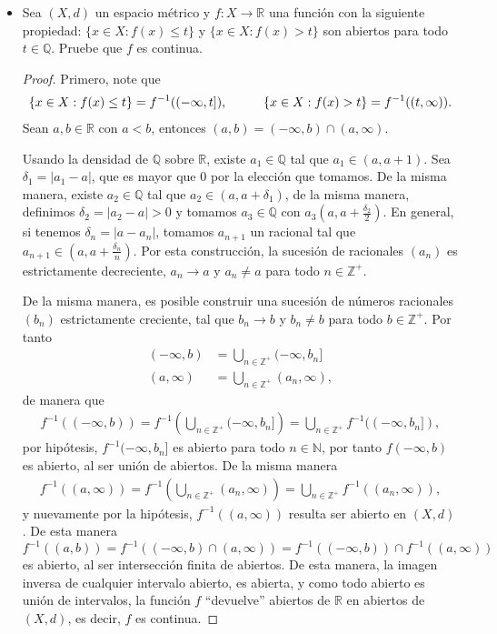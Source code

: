 \begin{itemize}
\item Sea $(X,d)$ un espacio métrico y $f:X\to \mathbb{R}$ una función con la siguiente propiedad: $\{x\in X:f(x)\leq t\}$ y $\{x \in X:f(x)>t\}$ son abiertos para todo $t \in \mathbb{Q}$. Pruebe que $f$ es continua.\\

\begin{proof}
    Primero, note que 
    \begin{align*}
        \{x \in X:f(x)\leq t\}=f^{-1}((-\infty,t]), \hspace{10mm} \{x \in X:f(x)>t\}=f^{-1}((t,\infty)).
    \end{align*}
    Sean $a,b \in \mathbb{R}$  con $a<b$, entonces $(a,b)=(-\infty,b)\cap (a,\infty)$. 

    Usando la densidad de $\mathbb{Q}$ sobre $\mathbb{R}$, existe $a_1 \in \mathbb{Q}$ tal que $a_1\in (a,a+1)$. Sea $\delta_1=|a_1-a|$, que es mayor que $0$ por la elección que tomamos. De la misma manera, existe $a_2\in \mathbb{Q}$ tal que $a_2\in (a,a+\delta_1)$, de la misma manera, definimos $\delta_2=|a_2-a|>0$ y tomamos $a_3\in \mathbb{Q}$ con $\displaystyle a_3\left(a,a+\frac{\delta_2}{2}\right)$. En general, si tenemos $\delta_n=|a-a_n|$, tomamos $a_{n+1}$ un racional tal que $\displaystyle a_{n+1}\in \left(a,a+\frac{\delta_n}{n}\right)$. Por esta construcción, la sucesión de racionales $(a_n)$ es estrictamente decreciente, $a_n \to a$ y $a_n\neq a$ para todo $n \in \mathbb{Z}^+$. 

    De la misma manera, es posible construir una sucesión de números racionales $(b_n)$ estrictamente creciente, tal que $b_n\to b$ y $b_n\neq b$ para todo $b \in \mathbb{Z}^+$. Por tanto
    \begin{align*}
        (-\infty,b)&=\bigcup_{n \in \mathbb{Z}^+}(-\infty ,b_n]\\
        (a,\infty)&=\bigcup_{n\in \mathbb{Z}^+} (a_n,\infty),
    \end{align*}
    de manera que
    \begin{align*}
        f^{-1}((-\infty,b))=f^{-1}\left(\bigcup_{n \in \mathbb{Z}^+}(-\infty ,b_n]\right)=\bigcup_{n \in \mathbb{Z}^+}f^{-1}((-\infty,b_n]),
    \end{align*}
    por hipótesis, $f^{-1}(-\infty,b_n]$ es abierto para todo $n \in \mathbb{N}$, por tanto $f(-\infty,b)$ es abierto, al ser unión de abiertos. De la misma manera
    \begin{align*}
        f^{-1}((a,\infty))=f^{-1}\left(\bigcup_{n\in \mathbb{Z}^+} (a_n,\infty)\right)=\bigcup_{n\in \mathbb{Z}^+}f^{-1}((a_n,\infty)),
    \end{align*}
    y nuevamente por la hipótesis, $f^{-1}((a,\infty))$ resulta ser abierto en $(X,d)$. De esta manera $f^{-1}((a,b))=f^{-1}((-\infty,b)\cap (a,\infty))=f^{-1}((-\infty,b))\cap f^{-1}((a,\infty))$ es abierto, al ser intersección finita de abiertos. De esta manera, la imagen inversa de cualquier intervalo abierto, es abierta, y como todo abierto es unión de intervalos, la función $f$ ``devuelve'' abiertos de $\mathbb{R}$ en abiertos de $(X,d)$, es decir, $f$ es continua.
\end{proof}
\end{itemize}